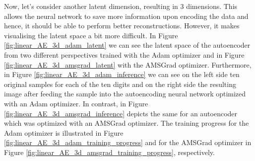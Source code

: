 Now, let's consider another latent dimension, resulting in $3$ dimensions. This allows the neural network to save more information upon encoding the data and hence, it should be able to perform better reconstructions. However, it makes visualising the latent space a bit more difficult. In Figure \ref{fig:linear_AE_3d_adam_latent} we can see the latent space of the autoencoder from two different perspectives trained with the Adam optimizer and in Figure \ref{fig:linear_AE_3d_amsgrad_latent} with the AMSGrad optimizer. Furthermore, in Figure \ref{fig:linear_AE_3d_adam_inference} we can see on the left side ten original samples for each of the ten digits and on the right side the resulting image after feeding the sample into the autoencoding neural network optimized with an Adam optimizer. In contrast, in Figure \ref{fig:linear_AE_3d_amsgrad_inference} depicts the same for an autoencoder which was optimized with an AMSGrad optimizer. The training progress for the Adam optimizer is illustrated in Figure \ref{fig:linear_AE_3d_adam_training_progress} and for the AMSGrad optimizer in Figure \ref{fig:linear_AE_3d_amsgrad_training_progress}, respectively.


